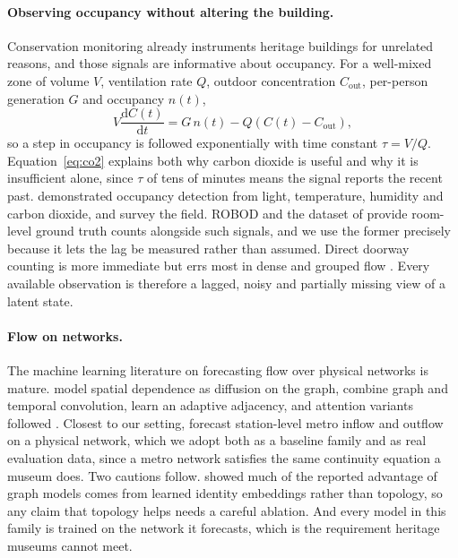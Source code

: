 \documentclass[11pt]{article}
\theoremstyle{plain}
\theoremstyle{definition}
\theoremstyle{remark}
\begin{document}
\paragraph{Observing occupancy without altering the building.}
Conservation monitoring already instruments heritage buildings for unrelated reasons, and those signals are informative about occupancy. For a well-mixed zone of volume $V$, ventilation rate $Q$, outdoor concentration $C_{\mathrm{out}}$, per-person generation $G$ and occupancy $n(t)$,
\begin{equation}
V\frac{\mathrm{d}C(t)}{\mathrm{d}t} = G\,n(t) - Q\left(C(t) - C_{\mathrm{out}}\right),
\label{eq:co2}
\end{equation}
so a step in occupancy is followed exponentially with time constant $\tau = V/Q$. Equation~\eqref{eq:co2} explains both why carbon dioxide is useful and why it is insufficient alone, since $\tau$ of tens of minutes means the signal reports the recent past. \citet{candanedo2016} demonstrated occupancy detection from light, temperature, humidity and carbon dioxide, and \citet{chen2018review} survey the field. ROBOD \citep{tekler2022robod} and the dataset of \citet{schwee2019} provide room-level ground truth counts alongside such signals, and we use the former precisely because it lets the lag be measured rather than assumed. Direct doorway counting is more immediate but errs most in dense and grouped flow \citep{brscic2013}. Every available observation is therefore a lagged, noisy and partially missing view of a latent state.

\paragraph{Flow on networks.}
The machine learning literature on forecasting flow over physical networks is mature. \citet{li2018dcrnn} model spatial dependence as diffusion on the graph, \citet{yu2018stgcn} combine graph and temporal convolution, \citet{wu2019graphwavenet} learn an adaptive adjacency, and attention variants followed \citep{guo2019astgcn,zheng2020gman}. Closest to our setting, \citet{liu2022pvcgn} forecast station-level metro inflow and outflow on a physical network, which we adopt both as a baseline family and as real evaluation data, since a metro network satisfies the same continuity equation a museum does. Two cautions follow. \citet{shao2022stid} showed much of the reported advantage of graph models comes from learned identity embeddings rather than topology, so any claim that topology helps needs a careful ablation. And every model in this family is trained on the network it forecasts, which is the requirement heritage museums cannot meet.
\end{document}
